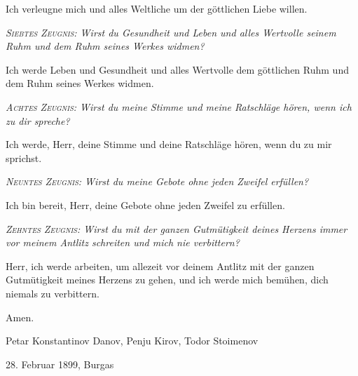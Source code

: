 Ich verleugne mich und alles Weltliche um der göttlichen Liebe willen.

\textit{\textsc{Siebtes Zeugnis:} Wirst du Gesundheit und Leben und alles Wertvolle seinem Ruhm und dem Ruhm seines Werkes widmen?}

Ich werde Leben und Gesundheit und alles Wertvolle dem göttlichen Ruhm und dem Ruhm seines Werkes widmen. 

\textit{\textsc{Achtes Zeugnis:} Wirst du meine Stimme und meine Ratschläge hören, wenn ich zu dir spreche?}

Ich werde, Herr, deine Stimme und deine Ratschläge hören, wenn du zu mir sprichst.

\textit{\textsc{Neuntes Zeugnis:} Wirst du meine Gebote ohne jeden Zweifel erfüllen?}

Ich bin bereit, Herr, deine Gebote ohne jeden Zweifel zu erfüllen.

\textit{\textsc{Zehntes Zeugnis:} Wirst du mit der ganzen Gutmütigkeit deines Herzens immer vor meinem Antlitz schreiten und mich nie verbittern?}

Herr, ich werde arbeiten, um allezeit vor deinem Antlitz mit der ganzen Gutmütigkeit meines Herzens zu gehen, und ich werde mich bemühen, dich niemals zu verbittern. 

\begin{flushright}
	Amen.
\end{flushright}

Petar Konstantinov Danov, Penju Kirov, Todor Stoimenov

28. Februar 1899, Burgas




